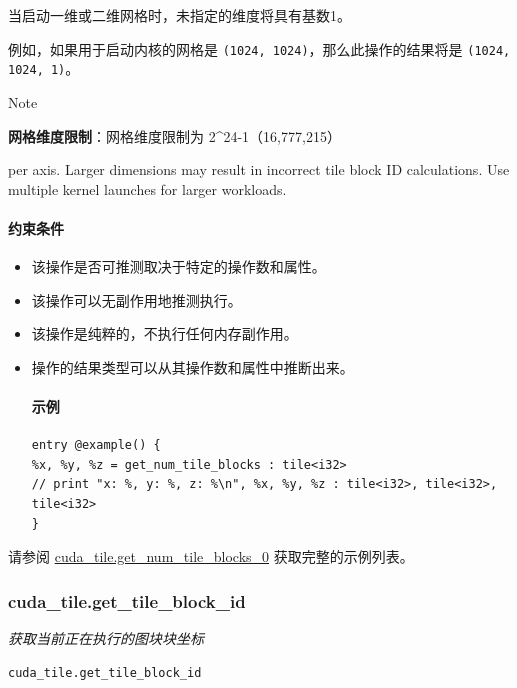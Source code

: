 \documentclass{article}
\begin{document}
当启动一维或二维网格时，未指定的维度将具有基数1。


例如，如果用于启动内核的网格是 \texttt{(1024, 1024)}，那么此操作的结果将是 \texttt{(1024, 1024, 1)}。


Note


\textbf{网格维度限制}：网格维度限制为 2\textasciicircum{}24-1（16,777,215）

per axis. Larger dimensions may result in incorrect tile block ID calculations. Use multiple kernel launches for larger workloads.



\paragraph{约束条件}

\begin{itemize}
\item 该操作是否可推测取决于特定的操作数和属性。
\item 该操作可以无副作用地推测执行。
\item 该操作是纯粹的，不执行任何内存副作用。
\item 操作的结果类型可以从其操作数和属性中推断出来。


\paragraph{示例}

\begin{lstlisting}
entry @example() {
%x, %y, %z = get_num_tile_blocks : tile<i32>
// print "x: %, y: %, z: %\n", %x, %y, %z : tile<i32>, tile<i32>, tile<i32>
}
\end{lstlisting}

\end{itemize}
请参阅 \href{https://docs.nvidia.com/cuda/tile-ir/latest/sections/appendix.html#example-cuda-tile-get-num-tile-blocks-0}{cuda\_tile.get\_num\_tile\_blocks\_0} 获取完整的示例列表。



\subsubsection{cuda\_tile.get\_tile\_block\_id}

\textit{获取当前正在执行的图块块坐标}


\begin{lstlisting}
cuda_tile.get_tile_block_id
\end{lstlisting}
\end{document}
